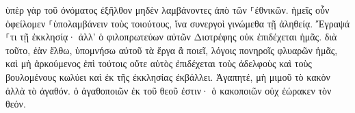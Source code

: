 \documentclass{openreader}
\begin{document}
ὑπὲρ γὰρ τοῦ ὀνόματος ἐξῆλθον μηδὲν λαμβάνοντες ἀπὸ τῶν ⸀ἐθνικῶν. ἡμεῖς οὖν ὀφείλομεν ⸀ὑπολαμβάνειν τοὺς τοιούτους, ἵνα συνεργοὶ γινώμεθα τῇ ἀληθείᾳ. Ἔγραψά ⸀τι τῇ ἐκκλησίᾳ· ἀλλ’ ὁ φιλοπρωτεύων αὐτῶν Διοτρέφης οὐκ ἐπιδέχεται ἡμᾶς. διὰ τοῦτο, ἐὰν ἔλθω, ὑπομνήσω αὐτοῦ τὰ ἔργα ἃ ποιεῖ, λόγοις πονηροῖς φλυαρῶν ἡμᾶς, καὶ μὴ ἀρκούμενος ἐπὶ τούτοις οὔτε αὐτὸς ἐπιδέχεται τοὺς ἀδελφοὺς καὶ τοὺς βουλομένους κωλύει καὶ ἐκ τῆς ἐκκλησίας ἐκβάλλει. Ἀγαπητέ, μὴ μιμοῦ τὸ κακὸν ἀλλὰ τὸ ἀγαθόν. ὁ ἀγαθοποιῶν ἐκ τοῦ θεοῦ ἐστιν· ὁ κακοποιῶν οὐχ ἑώρακεν τὸν θεόν. 
\end{document}
